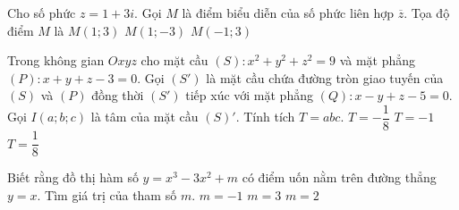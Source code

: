 \begin{ex}%
Cho số phức $z=1+3i$. Gọi $M$ là điểm biểu diễn của số phức liên hợp $\overline{z}$. Tọa độ điểm $M$ là
{$M(1;3)$}
{\True $M(1;-3)$}
{$M(-1;3)$}
\end{ex}

\begin{ex}%
Trong không gian $Oxyz$ cho mặt cầu $(S)\colon x^2+y^2+z^2=9$ và mặt phẳng $(P)\colon x+y+z-3=0$. Gọi $(S')$ là mặt cầu chứa đường tròn giao tuyến của $(S)$ và $(P)$ đồng thời $(S')$ tiếp xúc với mặt phẳng $(Q)\colon x-y+z-5=0$. Gọi $I(a;b;c)$ là tâm của mặt cầu $(S)'$. Tính tích $T=abc$.
{$T=-\dfrac{1}{8}$}
{$T=-1$}
{\True $T=\dfrac{1}{8}$}
\end{ex}

\begin{ex}%
Biết rằng đồ thị hàm số $y=x^3-3x^2+m$ có điểm uốn nằm trên đường thẳng $y=x$. Tìm giá trị của tham số $m$.
{$m=-1$}
{\True $m=3$}
{$m=2$}
\end{ex}

